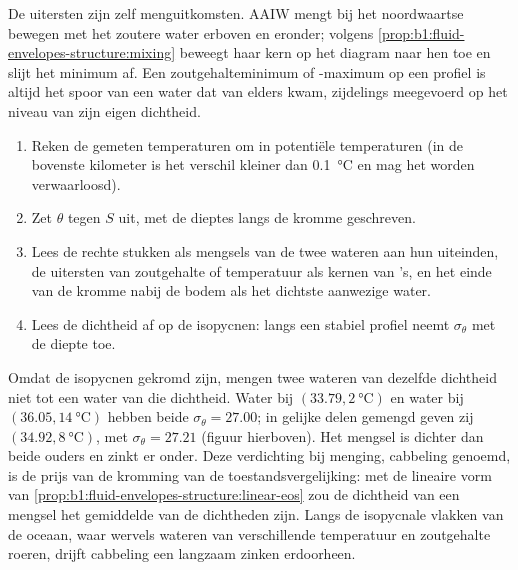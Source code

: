 De uitersten zijn zelf menguitkomsten. AAIW mengt bij het noordwaartse bewegen met het zoutere water erboven en eronder; volgens \cref{prop:b1:fluid-envelopes-structure:mixing} beweegt haar kern op het diagram naar hen toe en slijt het minimum af. Een zoutgehalteminimum of -maximum op een profiel is altijd het spoor van een water dat van elders kwam, zijdelings meegevoerd op het niveau van zijn eigen dichtheid.

\begin{method}\label{met:b1:fluid-envelopes-structure:ts}
\begin{enumerate}
  \item Reken de gemeten temperaturen om in potentiële temperaturen (in de bovenste kilometer is het verschil kleiner dan \qty{0.1}{\celsius} en mag het worden verwaarloosd).
  \item Zet $\theta$ tegen $S$ uit, met de dieptes langs de kromme geschreven.
  \item Lees de rechte stukken als mengsels van de twee wateren aan hun uiteinden, de uitersten van zoutgehalte of temperatuur als kernen van 's, en het einde van de kromme nabij de bodem als het dichtste aanwezige water.
  \item Lees de dichtheid af op de isopycnen: langs een stabiel profiel neemt $\sigma_\theta$ met de diepte toe.
\end{enumerate}
\end{method}

Omdat de isopycnen gekromd zijn, mengen twee wateren van dezelfde dichtheid niet tot een water van die dichtheid. Water bij $(33.79, \qty{2}{\celsius})$ en water bij $(36.05, \qty{14}{\celsius})$ hebben beide $\sigma_\theta = 27.00$; in gelijke delen gemengd geven zij $(34.92, \qty{8}{\celsius})$, met $\sigma_\theta = 27.21$ (figuur hierboven). Het mengsel is dichter dan beide ouders en zinkt er onder. Deze verdichting bij menging, cabbeling genoemd, is de prijs van de kromming van de toestandsvergelijking: met de lineaire vorm van \cref{prop:b1:fluid-envelopes-structure:linear-eos} zou de dichtheid van een mengsel het gemiddelde van de dichtheden zijn. Langs de isopycnale vlakken van de oceaan, waar wervels wateren van verschillende temperatuur en zoutgehalte roeren, drijft cabbeling een langzaam zinken erdoorheen.

